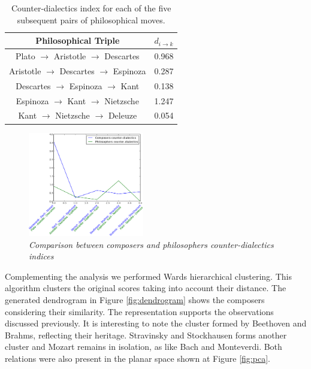 \documentclass[
 aip,
 jmp,
 amsmath,amssymb,
 reprint,
]{revtex4-1}
\begin{document}
\begin{table}%
\caption{\label{tab:tablephiE} Counter-dialectics index for each
of the five subsequent pairs of philosophical moves.}

\begin{tabular}{|c||c|}
\hline
Philosophical Triple & $d_{i \rightarrow k}$ \\
\hline \hline
Plato $\rightarrow$ Aristotle $\rightarrow$ Descartes    & 0.968 \\
Aristotle $\rightarrow$ Descartes $\rightarrow$ Espinoza & 0.287 \\
Descartes $\rightarrow$ Espinoza $\rightarrow$ Kant      & 0.138 \\
Espinoza $\rightarrow$ Kant $\rightarrow$ Nietzsche      & 1.247 \\
Kant $\rightarrow$ Nietzsche $\rightarrow$ Deleuze       & 0.054 \\
\hline
\end{tabular}
\end{table}

\begin{figure}[ht]
        \begin{center}
                \includegraphics[width=0.45\textwidth]{compara_dialeticas2}
        \end{center}
        \caption{\it Comparison between composers and philosophers
          counter-dialectics indices}
        \label{fig:comparingdialectics}
\end{figure}

Complementing the analysis we performed Wards hierarchical
clustering. This algorithm clusters the original scores taking into
account their distance. The generated dendrogram in
Figure \ref{fig:dendrogram} shows the composers
considering their similarity. The representation supports the
observations discussed previously. It is interesting to note the cluster
formed by Beethoven and Brahms, reflecting their heritage. Stravinsky
and Stockhausen forms another cluster and Mozart remains in isolation,
as like Bach and Monteverdi. Both relations were also present in the
planar space shown at Figure \ref{fig:pca}.
\end{document}
